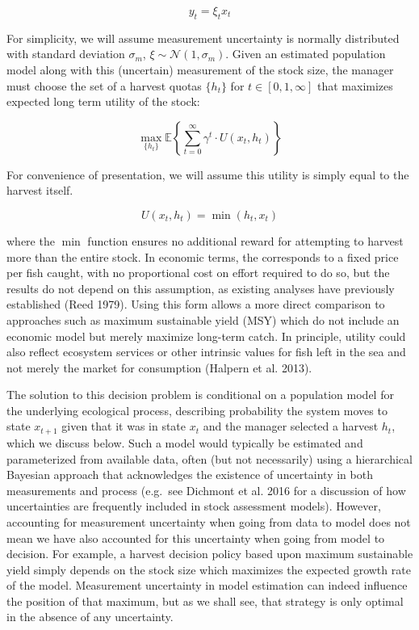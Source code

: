 \documentclass[3p]{elsarticle} %
\begin{document}
\begin{equation}
y_t = \xi_t x_t 
\end{equation}

For simplicity, we will assume measurement uncertainty is normally
distributed with standard deviation \(\sigma_m\),
\(\xi \sim \mathcal{N}(1, \sigma_m)\). Given an estimated population
model along with this (uncertain) measurement of the stock size, the
manager must choose the set of a harvest quotas \(\lbrace h_t \rbrace\)
for \(t \in [0, 1, \infty]\) that maximizes expected long term utility
of the stock:

\begin{equation}
\max_{ \lbrace h_t \rbrace } \mathbb{E} \left \{ \sum_{t=0}^{\infty} \gamma^t \cdot U(x_t, h_t) \right \}
\end{equation}

For convenience of presentation, we will assume this utility is simply
equal to the harvest itself.

\begin{equation}
 U(x_t, h_t) = \min(h_t, x_t)
\end{equation}

where the \(\min\) function ensures no additional reward for attempting
to harvest more than the entire stock. In economic terms, the
corresponds to a fixed price per fish caught, with no proportional cost
on effort required to do so, but the results do not depend on this
assumption, as existing analyses have previously established (Reed
1979). Using this form allows a more direct comparison to approaches
such as maximum sustainable yield (MSY) which do not include an economic
model but merely maximize long-term catch. In principle, utility could
also reflect ecosystem services or other intrinsic values for fish left
in the sea and not merely the market for consumption (Halpern et al.
2013).

The solution to this decision problem is conditional on a population
model for the underlying ecological process, describing probability the
system moves to state \(x_{t+1}\) given that it was in state \(x_t\) and
the manager selected a harvest \(h_t\), which we discuss below. Such a
model would typically be estimated and parameterized from available
data, often (but not necessarily) using a hierarchical Bayesian approach
that acknowledges the existence of uncertainty in both measurements and
process (e.g.~see Dichmont et al. 2016 for a discussion of how
uncertainties are frequently included in stock assessment models).
However, accounting for measurement uncertainty when going from data to
model does not mean we have also accounted for this uncertainty when
going from model to decision. For example, a harvest decision policy
based upon maximum sustainable yield simply depends on the stock size
which maximizes the expected growth rate of the model. Measurement
uncertainty in model estimation can indeed influence the position of
that maximum, but as we shall see, that strategy is only optimal in the
absence of any uncertainty.
\end{document}
